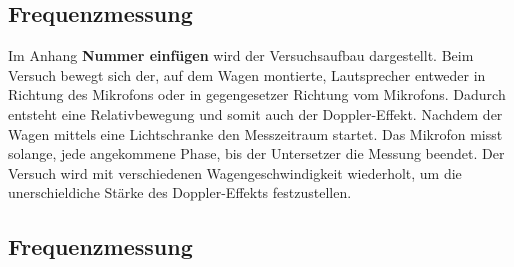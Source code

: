 \documentclass[parskip=half]{scrartcl} %
\begin{document}
\subsection{Frequenzmessung}

Im Anhang \textbf{Nummer einfügen} wird der Versuchsaufbau dargestellt.
Beim Versuch bewegt sich der, auf dem Wagen montierte, Lautsprecher entweder 
in Richtung des Mikrofons oder in gegengesetzer Richtung vom Mikrofons.
Dadurch entsteht eine Relativbewegung und somit auch der
Doppler-Effekt.
Nachdem der Wagen mittels eine Lichtschranke den Messzeitraum startet.
Das Mikrofon misst solange, jede angekommene Phase, bis der Untersetzer 
die Messung beendet.
Der Versuch wird mit verschiedenen Wagengeschwindigkeit
wiederholt, um die unerschieldiche Stärke des Doppler-Effekts 
festzustellen.

\subsection{Frequenzmessung}

\printbibliography
\printindex
\end{document}
